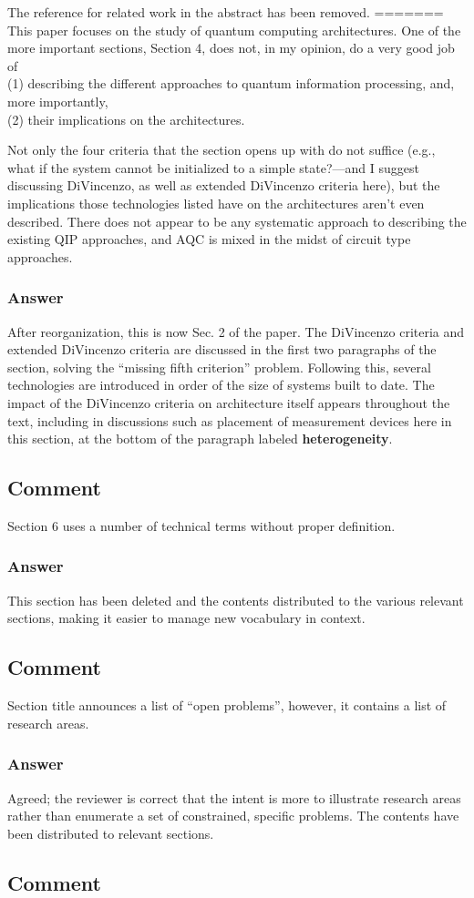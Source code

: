 \documentclass{article}
\newcommand{\comment}{\subsection{Comment}\em}
\newcommand{\answer}{\rm \subsubsection*{Answer}}
\begin{document}
The reference for related work in the abstract has been removed.
=======
This paper focuses on the study of quantum computing
architectures. One of the more important sections, Section 4, does
not, in my opinion, do a very good job of\\
(1) describing the different approaches to quantum information
processing, and, more importantly,\\
(2) their implications on the architectures.

Not only the four criteria that the section opens up with do not
suffice (e.g., what if the system cannot be initialized to a simple
state?---and I suggest discussing DiVincenzo, as well as extended
DiVincenzo criteria here), but the implications those technologies
listed have on the architectures aren't even described.  There does
not appear to be any systematic approach to describing the existing
QIP approaches, and AQC is mixed in the midst of circuit type
approaches.

\answer

After reorganization, this is now Sec. 2 of the paper.  The DiVincenzo
criteria and extended DiVincenzo criteria are discussed in the first
two paragraphs of the section, solving the ``missing fifth criterion''
problem.  Following this, several technologies are introduced in order
of the size of systems built to date.  The impact of the DiVincenzo
criteria on architecture itself appears throughout the text, including
in discussions such as placement of measurement devices here in this
section, at the bottom of the paragraph labeled {\bf heterogeneity}.

\comment

Section 6 uses a number of technical terms without proper definition.

\answer

This section has been deleted and the contents distributed to the
various relevant sections, making it easier to manage new vocabulary
in context.

\comment

Section title announces a list of ``open problems'', however, it
contains a list of research areas.  

\answer

Agreed; the reviewer is correct that the intent is more to illustrate
research areas rather than enumerate a set of constrained, specific
problems.  The contents have been distributed to relevant sections.

\comment
\end{document}
